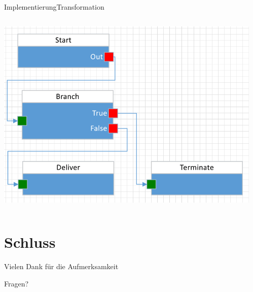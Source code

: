 \documentclass[t,aspectratio=169,divpsnames]{beamer}
\begin{document}
\begin{frame}[fragile]{Implementierung}{Transformation}
	\begin{columns}[T]
		\begin{column}{0.4\textwidth}
			\center
			\includegraphics[width=\textwidth]{img/FlowToCodeExample.png}
		\end{column}
		\begin{column}{0.6\textwidth}
			\only<2>
			{
				
			}
			{
				
			}
			{
				
			}
			{
				
			}
		\end{column}
	\end{columns}
\end{frame}

\section*{Schluss}
\begin{frame}
	\begin{center}
		\huge{Vielen Dank für die Aufmerksamkeit}
	\end{center}
	\begin{center}
		\Huge{Fragen?}
	\end{center}
\end{frame}

\begin{frame}[allowframebreaks]{\bibname}
\end{frame}
\end{document}
